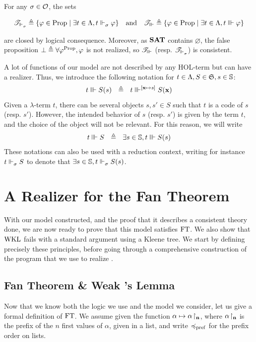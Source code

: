 \documentclass[a4paper,UKenglish,cleveref, autoref, thm-restate]{lipics-v2021}
\begin{document}
\begin{corollary}
For any $\sigma\in\mathcal O$, the sets

\[\mathscr T_{\Vdash_{\sigma}^{}} \triangleq \{ \varphi \in \mathrm{Prop} \mid \exists t \in \Lambda, t \Vdash_{\sigma}^{} \varphi\}
 \quad\text{and}\quad \mathscr T_{\Vvdash} \triangleq \{ \varphi \in \mathrm{Prop} \mid \exists t \in \Lambda, t \Vvdash \varphi\}\]

are closed by logical consequence. Moreover, as ${\mathbf{SAT}}$ contains $\varnothing$,
the false proposition $\bot \triangleq \forall \varphi^{\mathrm{Prop}}, \varphi$
is not realized, so $\mathscr T_{\Vvdash}$ (resp. $\mathscr T_{\Vdash_{\sigma}^{}}$) is consistent.
\end{corollary}

\begin{notation}
  A lot of functions of our model are not described by any HOL-term but can have a realizer. Thus, we introduce the following notation for $t \in \Lambda, S \in \mathfrak S, s \in \mathbb S$:
  \[t \Vvdash S(s) ~~\triangleq ~~t \Vvdash^{[\mathbf{x} \mapsto s]} S(\mathbf{x})\]
  Given a $\lambda$-term $t$, there can be several objects $s,s' \in S$ such that $t$ is a code of $s$ (resp. $s'$). However, the intended behavior of $s$ (resp. $s'$) is given by the term $t$, and the choice of the object will not be relevant. For this reason, we will write
  \[t \Vvdash S ~~\triangleq~~ \exists s \in \mathbb S, t \Vvdash S(s)\]
  These notations can also be used with a reduction context, writing for instance $t\Vdash_{\sigma}^{} S$ to denote that $\exists s \in \mathbb S, t \Vdash_{\sigma}^{} S(s)$.
\end{notation}


\section{A Realizer for the Fan Theorem}
\label{s:FT}
With our model constructed, and the proof that it describes
a consistent theory done, we are now ready to prove
that this model satisfies $\mathrm{FT}$. We also show
that $\mathrm{WKL}$ fails with a standard argument using a Kleene tree.
We start by defining precisely these principles, before going through a comprehensive
construction of the program that we use to realize \FT.
\subsection{Fan Theorem \& Weak \Konig's Lemma}


Now that we know both the logic we use and the model we consider,
let us give a formal definition of $\mathrm{FT}$.
We assume given the function $\alpha \mapsto {\alpha}\!\upharpoonright_{\mathbf{n}}$, where ${\alpha}\!\upharpoonright_{\mathbf{n}}$ is the
prefix of the $n$ first values of $\alpha$, given in a list,
and write $\preccurlyeq_{\mathrm{pref}}$ for the prefix order on lists.
\end{document}
